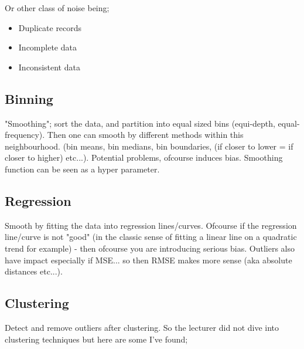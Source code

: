 \documentclass{article}
\begin{document}
Or other class of noise being;

\begin{itemize}
	\item Duplicate records
	\item Incomplete data
	\item Inconsistent data
\end{itemize}

\subsection{Binning}
"Smoothing"; sort the data, and partition into equal sized bins (equi-depth, equal-frequency). Then one can smooth by different methods within this neighbourhood. (bin means, bin medians, bin boundaries, (if closer to lower = if closer to higher) etc...). Potential problems, ofcourse induces bias. Smoothing function can be seen as a hyper parameter.

\subsection{Regression}
Smooth by fitting the data into regression lines/curves. Ofcourse if the regression line/curve is not "good" (in the classic sense of fitting a linear line on a quadratic trend for example) - then ofcourse you are introducing serious bias. Outliers also have impact especially if MSE... so then RMSE makes more sense (aka absolute distances etc...).

\subsection{Clustering}
Detect and remove outliers after clustering. So the lecturer did not dive into clustering techniques but here are some I've found;
\end{document}
